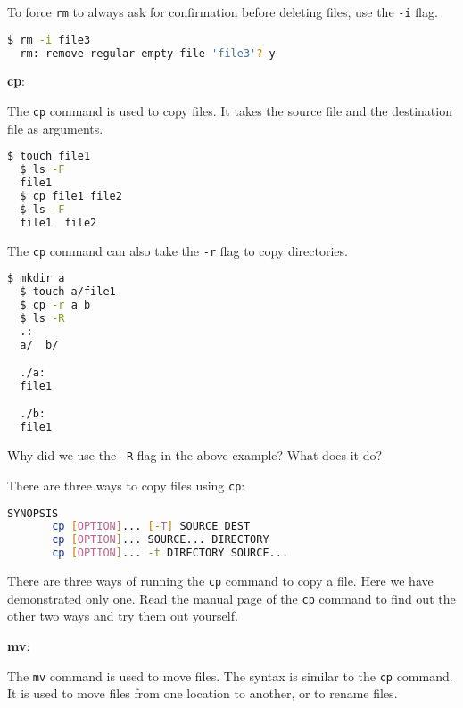 To force \texttt{rm} to always ask for confirmation before deleting files, use the \texttt{-i} flag.

\begin{lstlisting}[language=bash]
  $ rm -i file3
  rm: remove regular empty file 'file3'? y
\end{lstlisting}

\textbf{cp}:

The \texttt{cp} command is used to copy files.
It takes the source file and the destination file as arguments.

\begin{lstlisting}[language=bash]
  $ touch file1
  $ ls -F
  file1
  $ cp file1 file2
  $ ls -F
  file1  file2
\end{lstlisting}

The \texttt{cp} command can also take the \texttt{-r} flag to copy directories.

\begin{lstlisting}[language=bash]
  $ mkdir a
  $ touch a/file1
  $ cp -r a b
  $ ls -R
  .:
  a/  b/

  ./a:
  file1

  ./b:
  file1
\end{lstlisting}

\begin{exercise}
  Why did we use the \texttt{-R} flag in the above example? What does it do?
\end{exercise}

There are three ways to copy files using \texttt{cp}:

\begin{lstlisting}[language=bash]
SYNOPSIS
       cp [OPTION]... [-T] SOURCE DEST
       cp [OPTION]... SOURCE... DIRECTORY
       cp [OPTION]... -t DIRECTORY SOURCE...
\end{lstlisting}

\begin{exercise}
  There are three ways of running the \texttt{cp} command to copy a file.
  Here we have demonstrated only one.
  Read the manual page of the \texttt{cp} command to find out the other two ways and try them out yourself.
\end{exercise}

\textbf{mv}:

The \texttt{mv} command is used to move files.
The syntax is similar to the \texttt{cp} command.
It is used to move files from one location to another, or to rename files.

